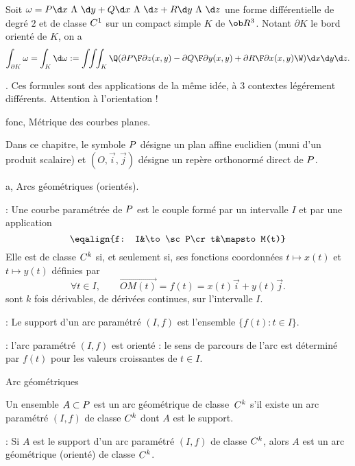 \Theoreme [Title=Formule d'Ostrogradski] Soit $\omega=P\d x\ \Lambda\ \d y
+Q\d x\ \Lambda\ \d z+R\d y\ \Lambda\ \d z$ une forme diff\'erentielle 
de degr\'e $2$ et de classe $\sc C^1$ sur un compact simple $K$ de $\ob R^3$. 
Notant $\partial K$ le bord orient\'e de $K$, on a  
$$
\int_{\partial K}\omega=\int_K\d \omega:=
\int\!\!\int\!\!\int_K\Q({\partial P\F\partial z}(x,y)-{\partial Q\F\partial y}(x,y)
+{\partial R\F\partial x}(x,y)\W)\d x\d y\d z.
$$

\Remarque. Ces formules sont des applications de la m\^eme id\'ee, 
\`a $3$ contextes l\'eg\'erement diff\'erents. Attention \`a l'orientation ! 





\pagetitretrue

\Chapter fonc, M\'etrique des courbes planes.
\bigskip


\noindent
Dans ce chapitre, le symbole $\sc P$ d\'esigne un plan affine euclidien (muni d'un produit scalaire) 
et $(O,\vec i,\vec j)$ d\'esigne un rep\`ere orthonorm\'e direct de $\sc P$. 
\bigskip

\Section a, Arcs g\'eom\'etriques (orient\'es).

\Rappel : Une courbe param\'etr\'ee de $\sc P$ est le couple form\'e par un intervalle $I$ et par une application 
$$
\eqalign{f: I&\to\sc P\cr t&\mapsto  M(t)}
$$ 
Elle est de classe $\sc C^k$ si, et seulement si, ses fonctions coordonn\'ees $t\mapsto x(t)$ et $t\mapsto y(t)$ d\'efinies par 
$$
\forall t\in I, \qquad \vec {OM(t)}=f(t)=x(t)\vec i+y(t)\vec j. 
$$
sont $k$ fois d\'erivables, de d\'eriv\'ees continues, sur l'intervalle $I$. 
\bigskip

\Rappel : Le support d'un arc param\'etr\'e $(I,f)$ est l'ensemble $\{f(t):t\in I\}$. 
\bigskip

\Remarque : l'arc param\'etr\'e $(I,f)$ est orient\'e : le sens de parcours de l'arc est d\'etermin\'e par $f(t)$ pour les valeurs croissantes de $t\in I$. 
\bigskip

\Concept Arc g\'eom\'etriques

\Definition[] Un ensemble $A\subset\sc P$ est un arc g\'eom\'etrique de classe~$\sc C^k$  
s'il existe un arc param\'etr\'e $(I,f)$ de classe $\sc C^k$ dont $A$ est le support. 
\bigskip

\Remarque : Si $A$ est le support d'un arc param\'etr\'e $(I,f)$ de classe $\sc C^k$, alors $A$ est un arc g\'eom\'etrique (orient\'e) de classe $\sc C^k$. 
\bigskip


